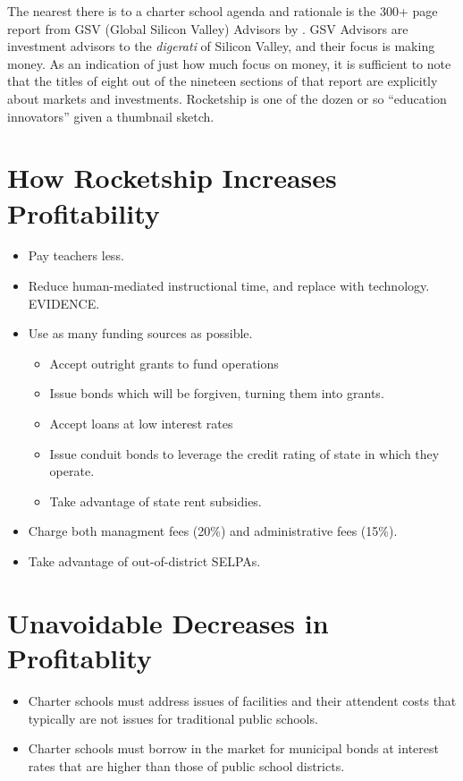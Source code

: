 The nearest there is to a charter school agenda and rationale is the 300+ page report from GSV (Global Silicon Valley) Advisors  by \citeauthor{Moe.etal2012}. GSV Advisors are investment advisors to the \emph{digerati} of Silicon Valley, and their focus is making money. As an indication of just how much  focus on money, it is sufficient to note that the titles of eight out of the nineteen sections of that report are explicitly about markets and investments. Rocketship is one of the dozen or so ``education innovators'' given a thumbnail sketch. %

\section{How Rocketship Increases Profitability}\indent%
\label{sec:how-rock-incr}

\begin{itemize}
  \item Pay teachers less.
  \item Reduce human-mediated instructional time, and replace with technology. EVIDENCE.
  \item Use as many funding sources as possible.
  \begin{itemize}
    \item Accept outright grants to fund operations
    \item Issue bonds which will be forgiven, turning them into grants.
    \item Accept loans at low interest rates
    \item Issue conduit bonds to leverage the credit rating of state in which they operate.
    \item Take advantage of state rent subsidies.
      \end{itemize}
  \item Charge both managment fees (20\%) and administrative fees (15\%). 
  \item Take advantage of out-of-district SELPAs.
\end{itemize}

\section{Unavoidable Decreases in Profitablity}\indent%
\label{sec:unavoidable_decr_profit}

\begin{itemize}
  \item Charter schools must address issues of facilities and their attendent costs that typically are not issues for traditional public schools.
  \item Charter schools must borrow in the market for municipal bonds at interest rates that are higher than those of public school districts.
\end{itemize}

